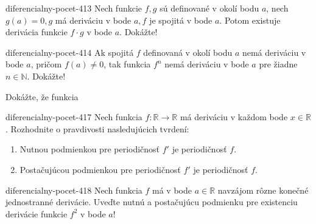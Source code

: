 \begin{defproblem}{diferencialny-pocet-413}
Nech funkcie $f,g$ sú definované v okolí bodu $a$, nech $g(a)=0,g$ má deriváciu v bode $a,f$ je spojitá v bode $a$. Potom existuje derivácia funkcie $f\cdot g$ v bode $a$. Dokážte!
\end{defproblem}

\begin{defproblem}{diferencialny-pocet-414}
Ak spojitá $f$ definovaná v okolí bodu $a$ nemá deriváciu v bode $a$, pričom $f(a)\neq 0$, tak funkcia $f^{n}$ nemá deriváciu v bode $a$ pre žiadne $n\in\mathbb{N}$. Dokážte!
\end{defproblem}

Dokážte, že funkcia


\begin{defproblem}{diferencialny-pocet-417}
Nech funkcia $f:\mathbb{R}\rightarrow\mathbb{R}$ má deriváciu v každom bode $x\in\mathbb{R}$. Rozhodnite o pravdivosti nasledujúcich tvrdení:
\begin{enumerate}
\item Nutnou podmienkou pre periodičnosť $f'$ je periodičnosť $f$.
\item Postačujúcou podmienkou pre periodičnosť $f'$ je periodičnosť $f$.
\end{enumerate}
\end{defproblem}

\begin{defproblem}{diferencialny-pocet-418}
Nech funkcia $f$ má v bode $a\in\mathbb{R}$ navzájom rôzne konečné jednostranné derivácie. Uveďte nutnú a postačujúcu podmienku pre existenciu derivácie funkcie $f^2$ v bode $a$!
\end{defproblem}

